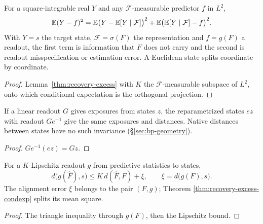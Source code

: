 \begin{theorem}\label{thm:recovery-excess-condexp}
  \leanok
  For a square-integrable real $Y$ and any $\mathcal F$-measurable predictor $f$
  in $L^2$,
  \[
    \mathbb{E}(Y-f)^2=\mathbb{E}\bigl(Y-\mathbb{E}[Y\mid\mathcal F]\bigr)^2
    +\mathbb{E}\bigl(\mathbb{E}[Y\mid\mathcal F]-f\bigr)^2 .
  \]
  With $Y=s$ the target state, $\mathcal F=\sigma(F)$ the representation and
  $f=g(F)$ a readout, the first term is information that $F$ does not carry and
  the second is readout misspecification or estimation error. A Euclidean state
  splits coordinate by coordinate.
\end{theorem}
\begin{proof}\leanok
  Lemma~\ref{thm:recovery-excess} with $K$ the $\mathcal F$-measurable
  subspace of $L^2$, onto which conditional expectation is the orthogonal
  projection.
\end{proof}

\begin{lemma}\label{thm:recovery-invariant}
  \leanok
  If a linear readout $G$ gives exposures from states $z$, the reparametrized
  states $ez$ with readout $Ge^{-1}$ give the same exposures and distances.
  Native distances between states have no such invariance
  (\S\ref{sec:bp-geometry}).
\end{lemma}
\begin{proof}\leanok
  $Ge^{-1}(ez)=Gz$.
\end{proof}

\begin{theorem}\label{thm:measurement-error}
  \leanok
  For a $K$-Lipschitz readout $g$ from predictive statistics to states,
  \[
    d\bigl(g(\hat F),s\bigr)\le K\,d(\hat
    F,F)+\xi,\qquad\xi=d\bigl(g(F),s\bigr).
  \]
  The alignment error $\xi$ belongs to the pair $(F,g)$; Theorem
  \ref{thm:recovery-excess-condexp} splits its mean square.
\end{theorem}
\begin{proof}\leanok
  The triangle inequality through $g(F)$, then the Lipschitz bound.
\end{proof}

